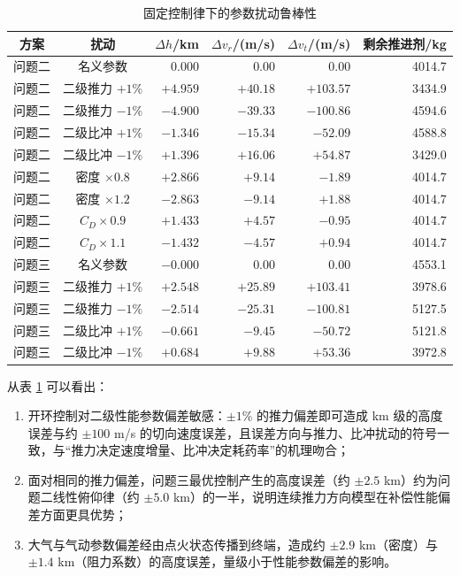 \documentclass[withoutpreface,bwprint]{cumcmthesis}
\begin{document}
\begin{table}[!htbp]
\caption{固定控制律下的参数扰动鲁棒性}
\label{tab:sens-open}
\centering
\begin{tabular}{c|c|r|r|r|r}
\toprule[1.5pt]
方案 & 扰动 & $\Delta h$/km & $\Delta v_r$/(m/s) & $\Delta v_t$/(m/s) & 剩余推进剂/kg \\
\midrule[1pt]
问题二 & 名义参数 & 0.000 & 0.00 & 0.00 & 4014.7 \\
问题二 & 二级推力 $+1\%$ & $+4.959$ & $+40.18$ & $+103.57$ & 3434.9 \\
问题二 & 二级推力 $-1\%$ & $-4.900$ & $-39.33$ & $-100.86$ & 4594.6 \\
问题二 & 二级比冲 $+1\%$ & $-1.346$ & $-15.34$ & $-52.09$ & 4588.8 \\
问题二 & 二级比冲 $-1\%$ & $+1.396$ & $+16.06$ & $+54.87$ & 3429.0 \\
问题二 & 密度 $\times0.8$ & $+2.866$ & $+9.14$ & $-1.89$ & 4014.7 \\
问题二 & 密度 $\times1.2$ & $-2.863$ & $-9.14$ & $+1.88$ & 4014.7 \\
问题二 & $C_D\times0.9$ & $+1.433$ & $+4.57$ & $-0.95$ & 4014.7 \\
问题二 & $C_D\times1.1$ & $-1.432$ & $-4.57$ & $+0.94$ & 4014.7 \\
\midrule[1pt]
问题三 & 名义参数 & $-0.000$ & 0.00 & 0.00 & 4553.1 \\
问题三 & 二级推力 $+1\%$ & $+2.548$ & $+25.89$ & $+103.41$ & 3978.6 \\
问题三 & 二级推力 $-1\%$ & $-2.514$ & $-25.31$ & $-100.81$ & 5127.5 \\
问题三 & 二级比冲 $+1\%$ & $-0.661$ & $-9.45$ & $-50.72$ & 5121.8 \\
问题三 & 二级比冲 $-1\%$ & $+0.684$ & $+9.88$ & $+53.36$ & 3972.8 \\
\bottomrule[1.5pt]
\end{tabular}
\end{table}

从表 \ref{tab:sens-open} 可以看出：
\begin{enumerate}
    \item 开环控制对二级性能参数偏差敏感：$\pm1\%$ 的推力偏差即可造成 km 级的高度误差与约 $\pm100$ m/s 的切向速度误差，且误差方向与推力、比冲扰动的符号一致，与“推力决定速度增量、比冲决定耗药率”的机理吻合；
    \item 面对相同的推力偏差，问题三最优控制产生的高度误差（约 $\pm2.5$ km）约为问题二线性俯仰律（约 $\pm5.0$ km）的一半，说明连续推力方向模型在补偿性能偏差方面更具优势；
    \item 大气与气动参数偏差经由点火状态传播到终端，造成约 $\pm2.9$ km（密度）与 $\pm1.4$ km（阻力系数）的高度误差，量级小于性能参数偏差的影响。
\end{enumerate}
\end{document}
